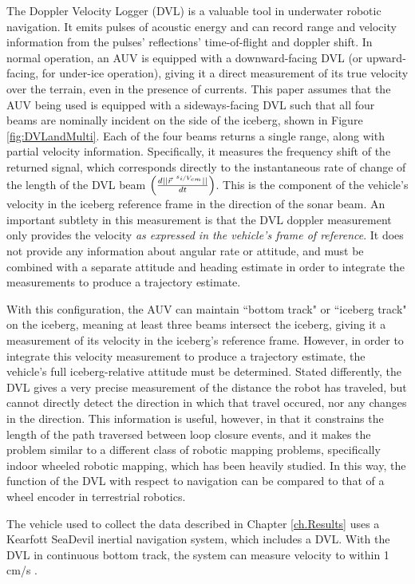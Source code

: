 The Doppler Velocity Logger (DVL) is a valuable tool in underwater robotic navigation. It emits pulses of acoustic energy and can record range and velocity information from the pulses' reflections' time-of-flight and doppler shift. In normal operation, an AUV is equipped with a downward-facing DVL (or upward-facing, for under-ice operation), giving it a direct measurement of its true velocity over the terrain, even in the presence of currents. This paper assumes that the AUV being used is equipped with a sideways-facing DVL such that all four beams are nominally incident on the side of the iceberg, shown in Figure \ref{fig:DVLandMulti}. Each of the four beams returns a single range, along with partial velocity information. Specifically, it measures the frequency shift of the returned signal, which corresponds directly to the instantaneous rate of change of the length of the DVL beam $\left( \frac{d||\vec{r}^{~\nicefrac{s_i}{V_{cm}}}||}{dt}\right)$. This is the component of the vehicle's velocity in the iceberg reference frame in the direction of the sonar beam. An important subtlety in this measurement is that the DVL doppler measurement only provides the velocity \emph{as expressed in the vehicle's frame of reference}. It does not provide any information about angular rate or attitude, and must be combined with a separate attitude and heading estimate in order to integrate the measurements to produce a trajectory estimate. 

With this configuration, the AUV can maintain ``bottom track" or ``iceberg track" on the iceberg, meaning at least three beams intersect the iceberg, giving it a measurement of its velocity in the iceberg's reference frame. However, in order to integrate this velocity measurement to produce a trajectory estimate, the vehicle's full iceberg-relative attitude must be determined. Stated differently, the DVL gives a very precise measurement of the distance the robot has traveled, but cannot directly detect the direction in which that travel occured, nor any changes in the direction. This information is useful, however, in that it constrains the length of the path traversed between loop closure events, and it makes the problem similar to a different class of robotic mapping problems, specifically indoor wheeled robotic mapping, which has been heavily studied. In this way, the function of the DVL with respect to navigation can be compared to that of a wheel encoder in terrestrial robotics.

The vehicle used to collect the data described in Chapter \ref{ch.Results} uses a Kearfott SeaDevil inertial navigation system, which includes a DVL. With the DVL in continuous bottom track, the system can measure velocity to within 1 cm/s \cite{McEwen2005}.

